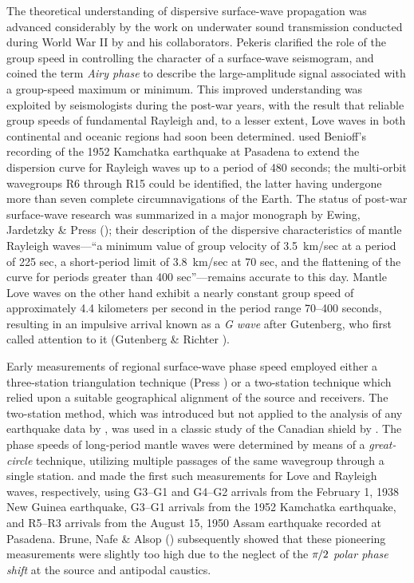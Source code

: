 The theoretical understanding of dispersive surface-wave propagation
was advanced considerably by the work on underwater sound transmission
conducted during World War II by \textcite{pekeris48} and his collaborators.
Pekeris clarified the role of the group speed in controlling the character
of a surface-wave seismogram, and coined the term {\em Airy phase\/} to
%
describe the large-amplitude signal associated with a group-speed maximum
or minimum.  This improved understanding was exploited by seismologists
during the post-war years, with the result that reliable group speeds of
fundamental Rayleigh and, to a lesser extent, Love waves in both continental
and oceanic regions had soon been determined.  \textcite{ewing&press54} used
Benioff's recording of the 1952 Kamchatka earthquake
%
at Pasadena to extend
the dispersion curve for Rayleigh waves up to a period of 480 seconds;
the multi-orbit wavegroups R6 through R15 could be identified, the latter
having undergone more than seven complete circumnavigations of the Earth.
The status of post-war surface-wave research was summarized in a
major monograph by Ewing, Jardetzky \& Press (\citeyear{ewing&al57});
their description of the dispersive characteristics
of mantle Rayleigh waves---``a minimum value of group velocity of 3.5~km/sec
at a period of 225 sec, a short-period limit of 3.8~km/sec at 70 sec, and the
flattening of the curve for periods greater than 400 sec''---remains
accurate to this day.
Mantle Love waves on the other hand exhibit a nearly constant group speed
of approximately 4.4 kilometers per second in the period range 70--400 seconds,
resulting in an impulsive arrival known as a {\em G wave\/} after
%
Gutenberg,
who first called attention to it
(Gutenberg \& Richter \citeyear{gutenberg&richter34}).

Early measurements of regional surface-wave phase speed employed either
a three-station triangulation technique
(Press \citeyear{press56}) or a two-station
technique which relied upon a suitable geographical alignment of the source
and receivers.  The two-station method, which was introduced but not applied
to the analysis of any earthquake data by \textcite{sato55}, was used in a
classic study of the Canadian shield by \textcite{brune&dorman63}.
The phase speeds of long-period mantle waves were determined by means
of a {\em great-circle\/} technique, utilizing multiple passages of the
same wavegroup through a single station.  \textcite{sato58} and
\textcite{nafe&brune60} made the first such measurements for Love
and Rayleigh waves, respectively, using G3--G1 and G4--G2 arrivals from
the February 1, 1938 New Guinea earthquake,
%
G3--G1 arrivals from the
1952 Kamchatka earthquake, and R5--R3 arrivals from the
August 15, 1950 Assam earthquake
%
recorded at Pasadena.
Brune, Nafe \& Alsop (\citeyear{brune&al61}) subsequently showed
that these pioneering measurements were slightly too high due to
the neglect of the $\pi\hspace{-0.3 mm}/\hspace{-0.1 mm}2$
{\em polar phase shift\/}
%
%
at the source and antipodal caustics.
%

